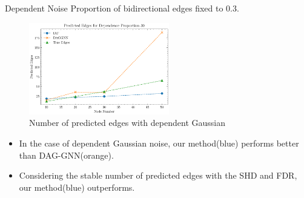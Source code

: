 \documentclass{beamer}
\begin{document}
\begin{frame}[allowframebreaks]{Dependent Noise}
    Proportion of bidirectional edges fixed to 0.3.
    \begin{figure}
        \centering
        \includegraphics[height=4cm]{fig/Predicted Edges_dependence_30.pdf}
        \caption{Number of predicted edges with dependent Gaussian}
        \label{fig:dep_gaussian_edges}
    \end{figure}
    \begin{itemize}
        \item In the case of dependent Gaussian noise, our method(blue) performs better than DAG-GNN(orange).
        \item Considering the stable number of predicted edges with the SHD and FDR, our method(blue) outperforms.
    \end{itemize}


\end{frame}
\end{document}
